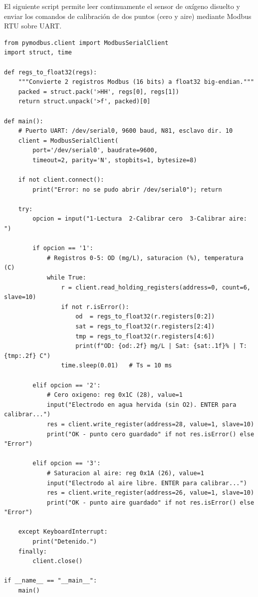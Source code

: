 El siguiente script permite leer continuamente el sensor de oxígeno disuelto
y enviar los comandos de calibración de dos puntos (cero y aire) mediante
Modbus RTU sobre UART.

\begingroup
{}

\begin{lstlisting}
from pymodbus.client import ModbusSerialClient
import struct, time

def regs_to_float32(regs):
    """Convierte 2 registros Modbus (16 bits) a float32 big-endian."""
    packed = struct.pack('>HH', regs[0], regs[1])
    return struct.unpack('>f', packed)[0]

def main():
    # Puerto UART: /dev/serial0, 9600 baud, N81, esclavo dir. 10
    client = ModbusSerialClient(
        port='/dev/serial0', baudrate=9600,
        timeout=2, parity='N', stopbits=1, bytesize=8)

    if not client.connect():
        print("Error: no se pudo abrir /dev/serial0"); return

    try:
        opcion = input("1-Lectura  2-Calibrar cero  3-Calibrar aire: ")

        if opcion == '1':
            # Registros 0-5: OD (mg/L), saturacion (%), temperatura (C)
            while True:
                r = client.read_holding_registers(address=0, count=6, slave=10)
                if not r.isError():
                    od  = regs_to_float32(r.registers[0:2])
                    sat = regs_to_float32(r.registers[2:4])
                    tmp = regs_to_float32(r.registers[4:6])
                    print(f"OD: {od:.2f} mg/L | Sat: {sat:.1f}% | T: {tmp:.2f} C")
                time.sleep(0.01)   # Ts = 10 ms

        elif opcion == '2':
            # Cero oxigeno: reg 0x1C (28), value=1
            input("Electrodo en agua hervida (sin O2). ENTER para calibrar...")
            res = client.write_register(address=28, value=1, slave=10)
            print("OK - punto cero guardado" if not res.isError() else "Error")

        elif opcion == '3':
            # Saturacion al aire: reg 0x1A (26), value=1
            input("Electrodo al aire libre. ENTER para calibrar...")
            res = client.write_register(address=26, value=1, slave=10)
            print("OK - punto aire guardado" if not res.isError() else "Error")

    except KeyboardInterrupt:
        print("Detenido.")
    finally:
        client.close()

if __name__ == "__main__":
    main()
\end{lstlisting}

\endgroup

